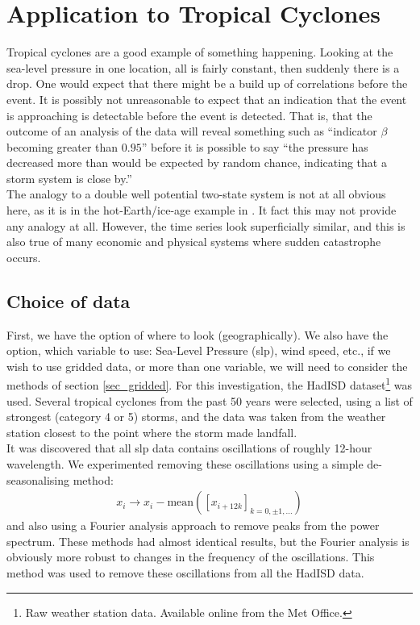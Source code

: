 \documentclass[11pt,a4paper,reqno]{article}
\numberwithin{equation}{section}
\begin{document}
\section{Application to Tropical Cyclones}
\label{sec_hurricanes}
Tropical cyclones are a good example of something happening. Looking at the sea-level pressure in one location, all is fairly constant, then suddenly there is a drop. One would expect that there might be a build up of correlations before the event. It is possibly not unreasonable to expect that an indication that the event is approaching is detectable before the event is detected. That is, that the outcome of an analysis of the data will reveal something such as ``indicator $\beta$ becoming greater than $0.95$'' before it is possible to say ``the pressure has decreased more than would be expected by random chance, indicating that a storm system is close by.''\\

The analogy to a double well potential two-state system is not at all obvious here, as it is in the hot-Earth/ice-age example in \cite{livina2011}. It fact this may not provide any analogy at all. However, the time series look superficially similar, and this is also true of many economic and physical systems where sudden catastrophe occurs.\\

\subsection{Choice of data}

First, we have the option of where to look (geographically). We also have the option, which variable to use: Sea-Level Pressure (slp), wind speed, etc., if we wish to use gridded data, or more than one variable, we will need to consider the methods of section \ref{sec_gridded}. For this investigation, the HadISD dataset\footnote{Raw weather station data. Available online from the Met Office.} was used. Several tropical cyclones from the past 50 years were selected, using a list of strongest (category 4 or 5) storms, and the data was taken from the weather station closest to the point where the storm made landfall.\\

It was discovered that all slp data contains oscillations of roughly 12-hour wavelength. We experimented removing these oscillations using a simple de-seasonalising method:
\begin{align}
x_i \longrightarrow x_i - \text{mean}\left( [x_{i+12k}]_{k = 0, \pm 1, ...} \right)
\end{align}
and also using a Fourier analysis approach to remove peaks from the power spectrum. These methods had almost identical results, but the Fourier analysis is obviously more robust to changes in the frequency of the oscillations. This method was used to remove these oscillations from all the HadISD data.\\ 
\end{document}
